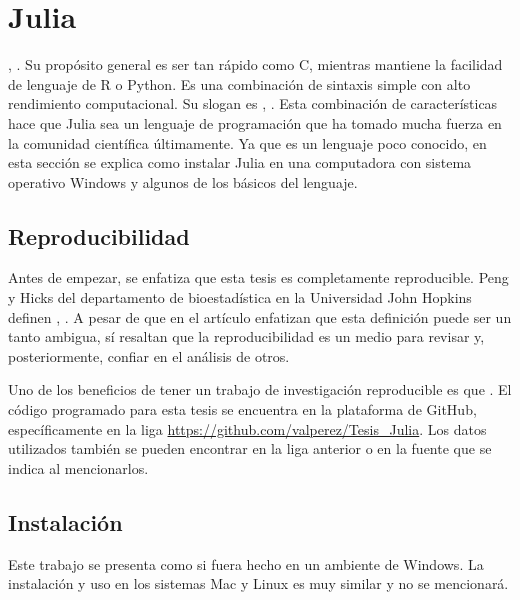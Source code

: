 \chapter{Julia}

, \cite{Hackers}.  Su propósito general es ser tan rápido como \textsf{C}, mientras mantiene la facilidad de lenguaje de \textsf{R} o \textsf{Python}. Es una combinación de sintaxis simple con alto rendimiento computacional. Su slogan es , \cite{Hackers}. 
Esta combinación de características hace que \textsf{Julia} sea un lenguaje de programación que ha tomado mucha fuerza  en la comunidad científica últimamente. Ya que es un lenguaje poco conocido, en esta sección se explica como instalar \textsf{Julia} en una computadora con sistema operativo \textsf{Windows} y algunos de los básicos del lenguaje.

\section{Reproducibilidad}
Antes de empezar, se enfatiza que esta tesis es completamente reproducible. Peng y Hicks del departamento de bioestadística en la Universidad John Hopkins definen , \cite{peng2021reproducible}. A pesar de que en el artículo enfatizan que esta definición puede ser un tanto ambigua, sí resaltan que la reproducibilidad es un medio para revisar y, posteriormente, confiar en el análisis de otros. 

Uno de los beneficios de tener un trabajo de investigación reproducible es que  \cite{peng2021reproducible}. El código programado para esta tesis se encuentra en la plataforma de GitHub, específicamente en la liga \url{https://github.com/valperez/Tesis_Julia}. Los datos utilizados también se pueden encontrar en la liga anterior o en la fuente que se indica al mencionarlos. 

\section{Instalación}
Este trabajo se presenta como si fuera hecho en un ambiente de \textsf{Windows}. La instalación y uso en los sistemas \textsf{Mac} y \textsf{Linux} es muy similar y no se mencionará.  

